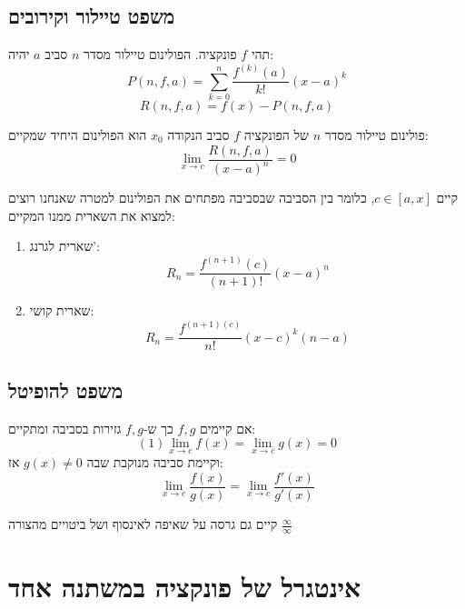\documentclass{tstextbook}
\begin{document}
\subsection{משפט טיילור וקירובים}

\begin{definition}
תהי \(f\) פונקציה. הפולינום טיילור מסדר \(n\) סביב \(a\) יהיה:
$$P(n,f,a)=\sum_{k=0}^n \frac{f^{(k)}(a)}{k!}(x-a)^k$$$$R(n,f,a) = f(x) - P(n, f, a)$$

\end{definition}
\begin{proposition}
פולינום טיילור מסדר \(n\) של הפונקציה \(f\) סביב הנקודה \(x_{0}\) הוא הפולינום היחיד שמקיים:
$$\lim_{x\rightarrow c} \frac{R(n,f,a)}{(x-a)^n} = 0$$

\end{proposition}
\begin{theorem}
קיים \(c\in [a,x]\), כלומר בין הסביבה שבסביבה מפתחים את הפולינום למטרה שאנחנו רוצים למצוא את השארית ממנו המקיים:

\end{theorem}
\begin{enumerate}
  \item שארית לגרנג': 
 $$R_n = \frac{f^{(n+1)}(c)}{(n+1)!}(x-a)^n$$


  \item שארית קושי: 
 $$R_n = \frac{f^{(n+1)(c)}}{n!}(x-c)^k(n-a)$$


\end{enumerate}
\subsection{משפט להופיטל}

\begin{theorem}[לופיטל]
אם קיימים \(f,g\) כך ש-\(f,g\) גזירות בסביבה ומתקיים:
    $$(1) \lim_{x\to c} f(x) =\lim_{x\to c} g(x) = 0$$
וקיימת סביבה מנוקבת שבה \(g(x)\neq 0\) אז:
    $$\lim_{x\rightarrow c} \frac{f(x)}{g(x)} = \lim_{x\rightarrow c} \frac{f'(x)}{g'(x)}$$

\end{theorem}
\begin{remark}
קיים גם גרסה על שאיפה לאינסוף ושל ביטויים מהצורה \(\frac{\infty}{\infty}\)

\end{remark}
\section{אינטגרל של פונקציה במשתנה אחד}
\end{document}
